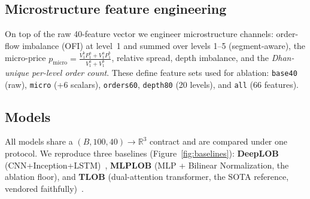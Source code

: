 \documentclass[fonts]{icst}
\begin{document}
\subsection{Microstructure feature engineering}
On top of the raw 40-feature vector we engineer microstructure channels: order-flow imbalance (OFI) at
level~1 and summed over levels 1--5 (segment-aware), the micro-price
$p_{\mathrm{micro}}=\tfrac{V_1^b P_1^a + V_1^a P_1^b}{V_1^a+V_1^b}$, relative spread, depth imbalance, and the
\emph{Dhan-unique per-level order count}. These define feature sets used for ablation: \texttt{base40} (raw),
\texttt{micro} (+6 scalars), \texttt{orders60}, \texttt{depth80} (20 levels), and \texttt{all} (66 features).

\subsection{Models}
All models share a $(B,100,40)\!\rightarrow\!\mathbb{R}^3$ contract and are compared under one protocol. We
reproduce three baselines (Figure~\ref{fig:baselines}): \textbf{DeepLOB} (CNN+Inception+LSTM)~\cite{deeplob},
\textbf{MLPLOB} (MLP + Bilinear Normalization, the ablation floor), and \textbf{TLOB} (dual-attention
transformer, the SOTA reference, vendored faithfully)~\cite{tlob}.
\end{document}

